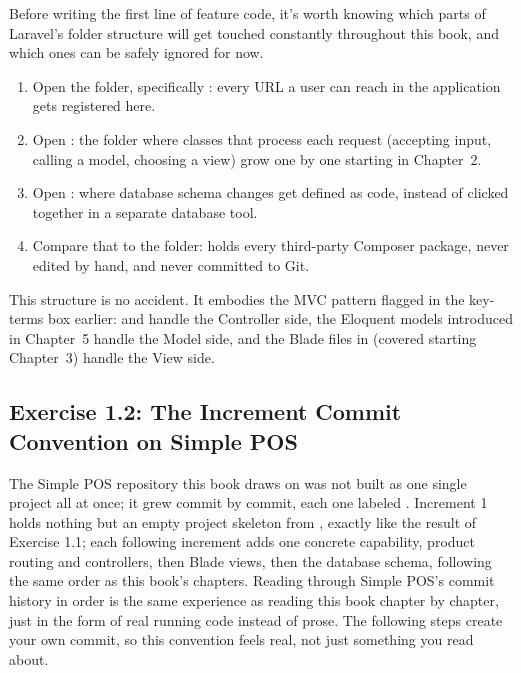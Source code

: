 Before writing the first line of feature code, it's worth knowing which
parts of Laravel's folder structure will get touched constantly throughout
this book, and which ones can be safely ignored for now.

\begin{enumerate}
  \item Open the  folder, specifically :
    every URL a user can reach in the application gets registered here.
  \item Open : the folder where classes that
    process each request (accepting input, calling a model, choosing a
    view) grow one by one starting in Chapter~2.
  \item Open : where database schema changes get
    defined as code, instead of clicked together in a separate database
    tool.
  \item Compare that to the  folder: holds every third-party
    Composer package, never edited by hand, and never committed to Git.
\end{enumerate}

This structure is no accident. It embodies the MVC pattern flagged in the
key-terms box earlier:  and 
handle the Controller side, the Eloquent models introduced in Chapter~5
handle the Model side, and the Blade files in 
(covered starting Chapter~3) handle the View side.

\subsection*{Exercise 1.2: The Increment Commit Convention on Simple POS}

The Simple POS repository this book draws on was not built as one single
project all at once; it grew commit by commit, each one labeled
. Increment 1 holds nothing but an empty project skeleton
from , exactly like the result of Exercise
1.1; each following increment adds one concrete capability, product routing
and controllers, then Blade views, then the database schema, following the
same order as this book's chapters. Reading through Simple POS's commit
history in order is the same experience as reading this book chapter by
chapter, just in the form of real running code instead of prose. The
following steps create your own  commit, so this
convention feels real, not just something you read about.

